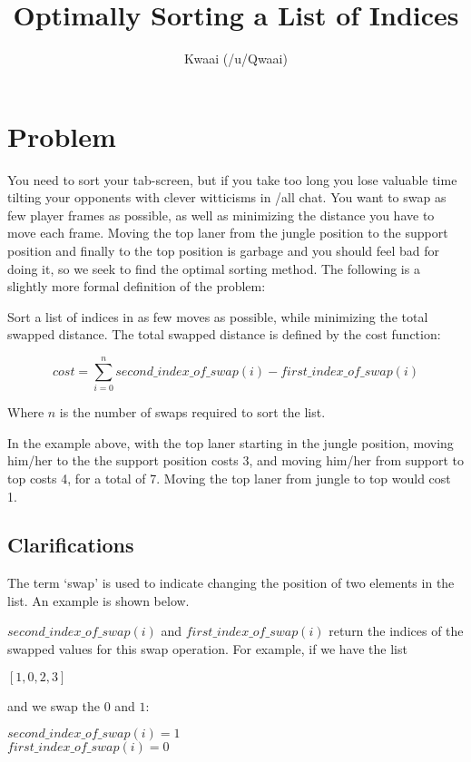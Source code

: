 \documentclass[11pt, oneside]{article}   	%
\title{Optimally Sorting a List of Indices}
\author{Kwaai (/u/Qwaai)}
\begin{document}
\maketitle

\section{Problem}
You need to sort your tab-screen, but if you take too long you lose valuable time tilting your opponents with clever witticisms in /all chat. You want to swap as few player frames as possible, as well as minimizing the distance you have to move each frame. Moving the top laner from the jungle position to the support position and finally to the top position is garbage and you should feel bad for doing it, so we seek to find the optimal sorting method. The following is a slightly more formal definition of the problem:

Sort a list of indices in as few moves as possible, while minimizing the total swapped distance. The total swapped distance is defined by the cost function:\
\begin{center}
$$cost = \sum_{i=0}^{n}second\_index\_of\_swap(i) - first\_index\_of\_swap(i)$$
\end{center}

Where $n$ is the number of swaps required to sort the list. 

In the example above, with the top laner starting in the jungle position, moving him/her to the the support position costs 3, and moving him/her from support to top costs 4, for a total of 7. Moving the top laner from jungle to top would cost 1.

\subsection{Clarifications}

The term `swap' is used to indicate changing the position of two elements in the list. An example is shown below.

$second\_index\_of\_swap(i)$ and $first\_index\_of\_swap(i)$ return the indices of the swapped values for this swap operation. For example, if we have the list

\begin{center}$[1, 0, 2, 3]$\end{center} and we swap the $0$ and $1$:

\begin{center}$second\_index\_of\_swap(i) = 1$ \\ $first\_index\_of\_swap(i) = 0$\end{center}
\end{document}
